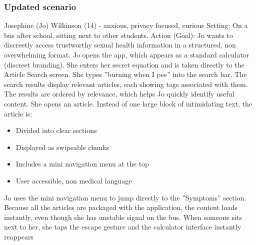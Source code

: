 \documentclass[a4paper,12pt]{article}
\begin{document}
\subsubsection{Updated scenario}

 Josephine (Jo) Wilkinson (14) - anxious, privacy focused, curious
Setting: On a bus after school, sitting next to other students.
Action (Goal): Jo wants to discreetly access trustworthy sexual health information in a structured,
non overwhelming format.
Jo opens the app, which appears as a standard calculator (discreet branding). She enters her
secret equation and is taken directly to the Article Search screen.
She types ”burning when I pee” into the search bar. The search results display relevant articles, each
showing tags associated with them. The results are ordered by relevance, which helps Jo quickly
identify useful content. She opens an article. Instead of one large block of intimidating text, the
article is:
\begin{itemize}
    \item Divided into clear sections
    \item Displayed as swipeable chunks
    \item Includes a mini navigation menu at the top
    \item  User accessible, non medical language
\end{itemize}

Jo uses the mini navigation menu to jump directly to the ”Symptoms” section.
Because all the articles are packaged with the application, the content loads instantly, even though
she has unstable signal on the bus.
When someone sits next to her, she taps the escape gesture and the calculator interface instantly
reappears
\end{document}
